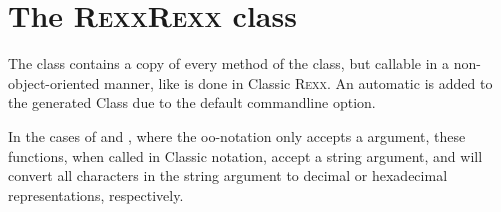 \section{The R\textsc{exx}R\textsc{exx} class}\label{refrexxrexx}

The  class contains a copy of every method of the  class, but callable in a non-object-oriented manner, like is done in Classic R\textsc{exx}. An automatic  is added to the generated Class due to the default  commandline option.

\label{c2classic}In the cases of  and , where the \nr{}
oo-notation only accepts a
 argument, these functions, when called in Classic notation,
accept a  string argument, and will convert all characters
in the string argument to decimal or hexadecimal representations, respectively.
